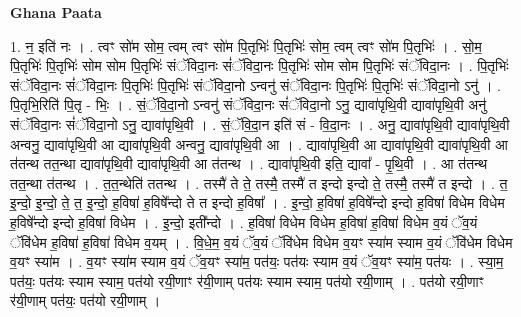 \documentclass[17pt]{extarticle}
\begin{document}
\textbf{Ghana Paata } \newline

1. न॒ इति॑ नः । . त्वꣳ सो॑म सोम॒ त्वम् त्वꣳ सो॑म पि॒तृभिः॑ पि॒तृभिः॑ सोम॒ त्वम् त्वꣳ सो॑म पि॒तृभिः॑ । . सो॒म॒ पि॒तृभिः॑ पि॒तृभिः॑ सोम सोम पि॒तृभिः॑ संॅविदा॒नः सं॑ॅविदा॒नः पि॒तृभिः॑ सोम सोम पि॒तृभिः॑ संॅविदा॒नः । . पि॒तृभिः॑ संॅविदा॒नः सं॑ॅविदा॒नः पि॒तृभिः॑ पि॒तृभिः॑ संॅविदा॒नो ऽन्वनु॑ संॅविदा॒नः पि॒तृभिः॑ पि॒तृभिः॑ संॅविदा॒नो ऽनु॑ । . पि॒तृभि॒रिति॑ पि॒तृ - भिः॒ । . सं॒ॅवि॒दा॒नो ऽन्वनु॑ संॅविदा॒नः सं॑ॅविदा॒नो ऽनु॒ द्यावा॑पृथि॒वी द्यावा॑पृथि॒वी अनु॑ संॅविदा॒नः सं॑ॅविदा॒नो ऽनु॒ द्यावा॑पृथि॒वी । . सं॒ॅवि॒दा॒न इति॑ सं - वि॒दा॒नः । . अनु॒ द्यावा॑पृथि॒वी द्यावा॑पृथि॒वी अन्वनु॒ द्यावा॑पृथि॒वी आ द्यावा॑पृथि॒वी अन्वनु॒ द्यावा॑पृथि॒वी आ । . द्यावा॑पृथि॒वी आ द्यावा॑पृथि॒वी द्यावा॑पृथि॒वी आ त॑तन्थ तत॒न्था द्यावा॑पृथि॒वी द्यावा॑पृथि॒वी आ त॑तन्थ । . द्यावा॑पृथि॒वी इति॒ द्यावा᳚ - पृ॒थि॒वी । . आ त॑तन्थ तत॒न्था त॑तन्थ । . त॒त॒न्थेति॑ ततन्थ । . तस्मै॑ ते ते॒ तस्मै॒ तस्मै॑ त इन्दो इन्दो ते॒ तस्मै॒ तस्मै॑ त इन्दो । . त॒ इ॒न्दो॒ इ॒न्दो॒ ते॒ त॒ इ॒न्दो॒ ह॒विषा॑ ह॒विषे᳚न्दो ते त इन्दो ह॒विषा᳚ । . इ॒न्दो॒ ह॒विषा॑ ह॒विषे᳚न्दो इन्दो ह॒विषा॑ विधेम विधेम ह॒विषे᳚न्दो इन्दो ह॒विषा॑ विधेम । . इ॒न्दो॒ इती᳚न्दो । . ह॒विषा॑ विधेम विधेम ह॒विषा॑ ह॒विषा॑ विधेम व॒यं ॅव॒यं ॅवि॑धेम ह॒विषा॑ ह॒विषा॑ विधेम व॒यम् । . वि॒धे॒म॒ व॒यं ॅव॒यं ॅवि॑धेम विधेम व॒यꣳ स्या॑म स्याम व॒यं ॅवि॑धेम विधेम व॒यꣳ स्या॑म । . व॒यꣳ स्या॑म स्याम व॒यं ॅव॒यꣳ स्या॑म॒ पत॑यः॒ पत॑यः स्याम व॒यं ॅव॒यꣳ स्या॑म॒ पत॑यः । . स्या॒म॒ पत॑यः॒ पत॑यः स्याम स्याम॒ पत॑यो रयी॒णाꣳ र॑यी॒णाम् पत॑यः स्याम स्याम॒ पत॑यो रयी॒णाम् । . पत॑यो रयी॒णाꣳ र॑यी॒णाम् पत॑यः॒ पत॑यो रयी॒णाम् । \newline
\end{document}
